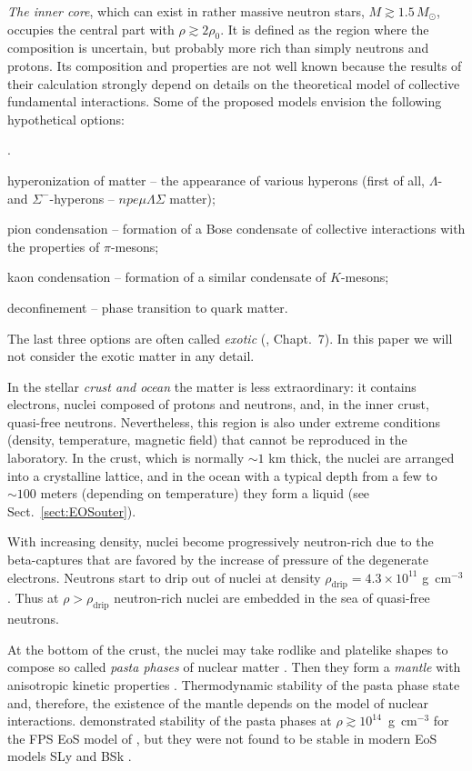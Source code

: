 \documentclass[smallextended]{svjour3}       %
\newenvironment{numlist}{
\setcounter{count}{0}
\begin{list}{\arabic{count}.}{
\setlength{\itemsep}{0ex}
\setlength{\parsep}{0pt}
\setlength{\parskip}{0pt}
\setlength{\topsep}{3pt}
\setlength{\partopsep}{3pt}
\usecounter{count}
}}{\end{list}}
\newcounter{count}
\newcommand{\gcc}{\mbox{g~cm$^{-3}$}}
\newcommand{\rhod}{\rho_\mathrm{drip}}
\begin{document}
\emph{The inner core}, which can exist in rather
massive neutron stars, $M\gtrsim1.5\,M_\odot$, occupies
the central part with $\rho\gtrsim2\rho_0$. It is defined as the region where the 
composition is uncertain, but probably more rich than simply neutrons and protons.
Its composition and properties are not well known because the results of their calculation strongly
depend on details on the theoretical model of collective
fundamental interactions. Some of the proposed models
envision the following hypothetical options:
\begin{numlist}
\item hyperonization of matter -- the appearance of various
   hyperons (first of all, $\Lambda$- and
$\Sigma^-$-hyperons -- $npe\mu\Lambda\Sigma$ matter);
\item pion condensation -- formation of a Bose condensate
   of collective interactions with the properties of $\pi$-mesons;
\item kaon condensation -- formation of a similar 
     condensate of $K$-mesons;
\item deconfinement -- phase transition to quark matter.
\end{numlist}
The last three options are often called  \emph{exotic}
(\citealp{HPY07}, Chapt.~7). In this paper we will not
consider the exotic matter in any detail.

In the stellar \emph{crust and ocean} the matter is less
extraordinary: it contains electrons, nuclei composed of
protons and neutrons, and, in the inner crust, quasi-free
neutrons. Nevertheless, this region is also under extreme
conditions (density, temperature, magnetic field) that
cannot be reproduced in the laboratory. In the crust, which
is normally $\sim1$ km thick, the nuclei are arranged into a
crystalline lattice, and in the ocean with a typical depth
from a few to $\sim100$ meters (depending on temperature)
they form a liquid (see Sect.~\ref{sect:EOSouter}).

With increasing density, nuclei become progressively
neutron-rich due to the beta-captures that are favored by
the increase of pressure of the degenerate electrons.
Neutrons start to drip out of nuclei at density $\rhod =
4.3\times 10^{11}$ \gcc{}. Thus at $\rho>\rhod$ neutron-rich
nuclei are embedded in the sea of quasi-free neutrons.

At the bottom of the crust, the nuclei may take rodlike and
platelike shapes to compose so called \emph{pasta phases} of
nuclear matter \citep{PethickRavenhall95}. Then they form a
\emph{mantle} with anisotropic kinetic properties
\citep{PethickPotekhin96}. Thermodynamic stability of the
pasta phase state and, therefore, the existence of the
mantle depends on the model of nuclear interactions.
\citet{LorenzRP93} demonstrated stability of the pasta
phases at $\rho\gtrsim10^{14}$~\gcc{} for the FPS EoS model
of \citet{Pandharipande89}, but they were not found to be
stable in modern EoS models SLy \citep{DouchinHaensel01} and
BSk \citep{Pearson-ea12}.
\end{document}
